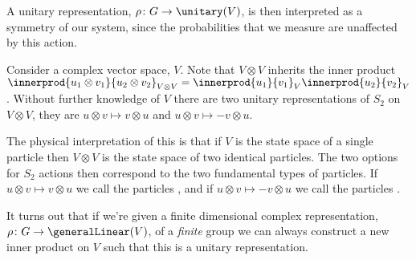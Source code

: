 \documentclass[fleqn]{NotesClass}
\begin{document}
    A unitary representation, \(\rho \colon G \to \unitary(V)\), is then interpreted as a symmetry of our system, since the probabilities that we measure are unaffected by this action.
    
    Consider a complex vector space, \(V\).
    Note that \(V \otimes V\) inherits the inner product \(\innerprod{u_1 \otimes v_1}{u_2 \otimes v_2}_{V \otimes V} = \innerprod{u_1}{v_1}_V \innerprod{u_2}{v_2}_V\).
    Without further knowledge of \(V\) there are two unitary representations of \(S_2\) on \(V \otimes V\), they are \(u \otimes v \mapsto v \otimes u\) and \(u \otimes v \mapsto -v \otimes u\).
    
    The physical interpretation of this is that if \(V\) is the state space of a single particle then \(V \otimes V\) is the state space of two identical particles.
    The two options for \(S_2\) actions then correspond to the two fundamental types of particles.
    If \(u \otimes v \mapsto v \otimes u\) we call the particles , and if \(u \otimes v \mapsto -v \otimes u\) we call the particles .
    
    It turns out that if we're given a finite dimensional complex representation, \(\rho \colon G \to \generalLinear(V)\), of a \emph{finite} group we can always construct a new inner product on \(V\) such that this is a unitary representation.
    
\end{document}
